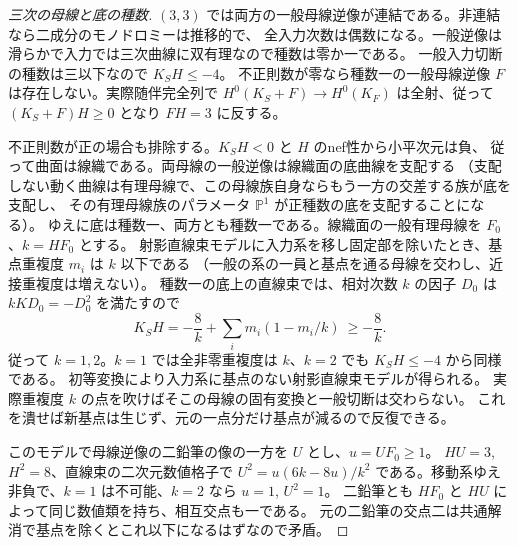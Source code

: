 \begin{proof}[三次の母線と底の種数]
$(3,3)$ では両方の一般母線逆像が連結である。非連結なら二成分のモノドロミーは推移的で、
全入力次数は偶数になる。一般逆像は滑らかで入力では三次曲線に双有理なので種数は零か一である。
一般入力切断の種数は三以下なので $K_S H\le-4$。
不正則数が零なら種数一の一般母線逆像 $F$ は存在しない。実際随伴完全列で
$H^0(K_S+F)\to H^0(K_F)$ は全射、従って $(K_S+F)H\ge0$ となり $FH=3$ に反する。

不正則数が正の場合も排除する。$K_SH<0$ と $H$ のnef性から小平次元は負、
従って曲面は線織である。両母線の一般逆像は線織面の底曲線を支配する
（支配しない動く曲線は有理母線で、この母線族自身ならもう一方の交差する族が底を支配し、
その有理母線族のパラメータ $\mathbb P^1$ が正種数の底を支配することになる）。
ゆえに底は種数一、両方とも種数一である。線織面の一般有理母線を $F_0$、$k=HF_0$ とする。
射影直線束モデルに入力系を移し固定部を除いたとき、基点重複度 $m_i$ は $k$ 以下である
（一般の系の一員と基点を通る母線を交わし、近接重複度は増えない）。
種数一の底上の直線束では、相対次数 $k$ の因子 $D_0$ は $kK D_0=-D_0^2$ を満たすので
\[
 K_S H=-\frac8k+\sum_i m_i(1-m_i/k)\ \ge -\frac8k .
\]
従って $k=1,2$。$k=1$ では全非零重複度は $k$、$k=2$ でも $K_SH\le-4$ から同様である。
初等変換により入力系に基点のない射影直線束モデルが得られる。
実際重複度 $k$ の点を吹けばそこの母線の固有変換と一般切断は交わらない。
これを潰せば新基点は生じず、元の一点分だけ基点が減るので反復できる。

このモデルで母線逆像の二鉛筆の像の一方を $U$ とし、$u=UF_0\ge1$。
$HU=3$, $H^2=8$、直線束の二次元数値格子で
$U^2=u(6k-8u)/k^2$ である。移動系ゆえ非負で、$k=1$ は不可能、$k=2$ なら $u=1$, $U^2=1$。
二鉛筆とも $HF_0$ と $HU$ によって同じ数値類を持ち、相互交点も一である。
元の二鉛筆の交点二は共通解消で基点を除くとこれ以下になるはずなので矛盾。
\end{proof}

